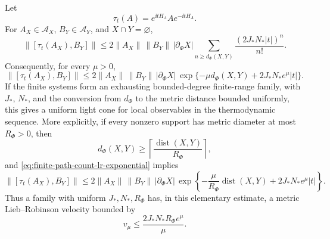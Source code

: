 \begin{theorem}
\label{thm:finite-path-count-lieb-robinson-bound}
Let
\[
  \tau_t(A)=e^{\ii tH_\Lambda}Ae^{-\ii tH_\Lambda}.
\]
For \(A_X\in\mathcal A_X\), \(B_Y\in\mathcal A_Y\), and
\(X\cap Y=\varnothing\),
\begin{equation}
  \|[\tau_t(A_X),B_Y]\|
  \le
  2\|A_X\|\,\|B_Y\|\,|\partial_\Phi X|
  \sum_{n\ge d_\Phi(X,Y)}
  \frac{(2J_*N_*|t|)^n}{n!}.
  \label{eq:finite-path-count-lr-bound}
\end{equation}
Consequently, for every \(\mu>0\),
\begin{equation}
  \|[\tau_t(A_X),B_Y]\|
  \le
  2\|A_X\|\,\|B_Y\|\,|\partial_\Phi X|\,
  \exp\{-\mu d_\Phi(X,Y)+2J_*N_*e^\mu |t|\}.
  \label{eq:finite-path-count-lr-exponential}
\end{equation}
If the finite systems form an exhausting bounded-degree finite-range family,
with \(J_*\), \(N_*\), and the conversion from \(d_\Phi\) to the metric
distance bounded uniformly, this gives a uniform light cone for local
observables in the thermodynamic sequence.
More explicitly, if every nonzero support has metric diameter at most
\(R_\Phi>0\), then
\[
  d_\Phi(X,Y)\ge
  \left\lceil\frac{\operatorname{dist}(X,Y)}{R_\Phi}\right\rceil ,
\]
and \eqref{eq:finite-path-count-lr-exponential} implies
\[
  \|[\tau_t(A_X),B_Y]\|
  \le
  2\|A_X\|\,\|B_Y\|\,|\partial_\Phi X|\,
  \exp\!\left\{-\frac{\mu}{R_\Phi}\operatorname{dist}(X,Y)
  +2J_*N_*e^\mu |t|\right\}.
\]
Thus a family with uniform \(J_*,N_*,R_\Phi\) has, in this elementary estimate,
a metric Lieb--Robinson velocity bounded by
\[
  v_\mu\le \frac{2J_*N_*R_\Phi e^\mu}{\mu}.
\]
\end{theorem}

